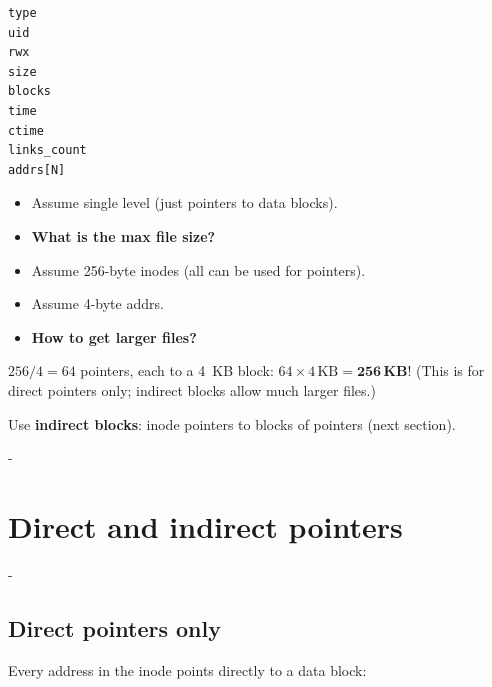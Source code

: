 \documentclass[11pt,a4paper]{article}
\makeatletter
\newcommand{\keepspace}[1]{\par\penalty-100\begingroup
  \setlength{\dimen@}{#1}\dimen@ii\pagegoal\advance\dimen@ii-\pagetotal
  \ifdim\dimen@>\dimen@ii\ifdim\dimen@ii>\z@\vfil\fi\break\fi\endgroup}
\makeatother
\begin{document}
\begin{center}
\begin{minipage}[t]{0.25\textwidth}
\begin{lstlisting}[language={}, numbers=none]
type
uid
rwx
size
blocks
time
ctime
links_count
addrs[N]
\end{lstlisting}
\end{minipage}\hfill
\begin{minipage}[t]{0.68\textwidth}
\begin{itemize}
  \item Assume single level (just pointers to data blocks).
  \item \textbf{What is the max file size?}
  \item Assume 256-byte inodes (all can be used for pointers).
  \item Assume 4-byte addrs.
  \item \textbf{How to get larger files?}
\end{itemize}
\end{minipage}
\end{center}

\begin{solbox}
\(256 / 4 = 64\) pointers, each to a 4~KB block:
\(64 \times 4\,\text{KB} = \mathbf{256\,KB}\)! (This is for direct pointers
only; indirect blocks allow much larger files.)
\end{solbox}

\begin{quizbox}
Use \textbf{indirect blocks}: inode pointers to blocks of pointers (next
section).
\end{quizbox}

\keepspace{8\baselineskip}
\section{Direct and indirect pointers}\label{sec:indirect}

\keepspace{12\baselineskip}
\subsection{Direct pointers only}

Every address in the inode points directly to a data block:
\end{document}
